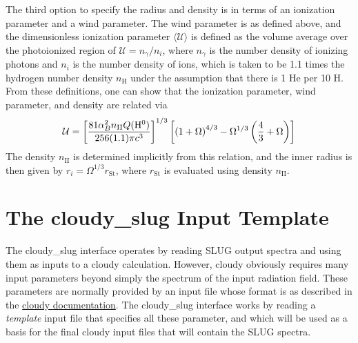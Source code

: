 \documentclass[letterpaper,10pt,english]{sphinxmanual}
\begin{document}
The third option to specify the radius and density is in terms of an
ionization parameter and a wind parameter. The wind parameter is as
defined above, and the dimensionless ionization parameter
\(\langle\mathcal{U}\rangle\) is defined as the volume average
over the photoionized region of
\(\mathcal{U} = n_\gamma / n_i\), where \(n_\gamma\)
is the number density of ionizing photons and \(n_i\)
is the number density of ions, which is taken to be
1.1 times the hydrogen number density \(n_{\mathrm{H}}\) under
the assumption that there is 1 He per 10 H. From these definitions,
one can show that the ionization parameter, wind parameter, and
density are related via
\begin{gather}
\begin{split}\mathcal{U} = \left[\frac{81 \alpha_B^2 n_{\mathrm{II}}
Q(\mathrm{H}^0)}{256 (1.1) \pi c^3}\right]^{1/3}
\left[\left(1 + \Omega\right)^{4/3}
- \Omega^{1/3} \left(\frac{4}{3}+\Omega\right)\right]\end{split}\notag
\end{gather}
The density \(n_{\mathrm{II}}\) is determined implicitly from this
relation, and the inner radius is then given by
\(r_i = \Omega^{1/3} r_{\mathrm{St}}\),
where \(r_{\mathrm{St}}\) is evaluated using density
\(n_{\mathrm{II}}\).


\section{The cloudy\_slug Input Template}
\label{cloudy:the-cloudy-slug-input-template}\label{cloudy:ssec-cloudy-template}
The cloudy\_slug interface operates by reading SLUG output spectra and
using them as inputs to a cloudy calculation. However, cloudy
obviously requires many input parameters beyond simply the spectrum of
the input radiation field. These parameters are normally provided by
an input file whose format is as described in the \href{http://nublado.org}{cloudy documentation}. The cloudy\_slug interface works by reading a
\emph{template} input file that specifies all these parameter, and which
will be used as a basis for the final cloudy input files that will
contain the SLUG spectra.
\end{document}
